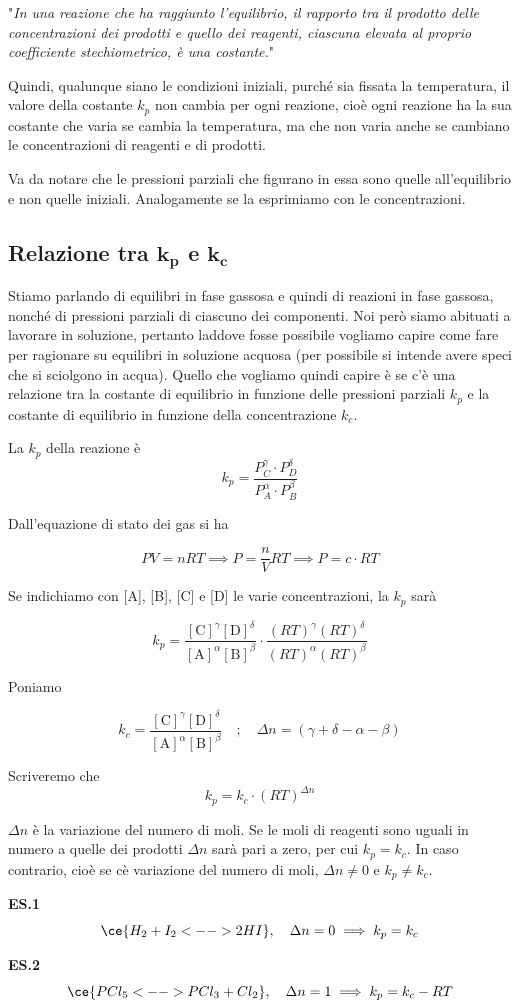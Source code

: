 \vspace{0.2cm}"\textit{In una reazione che ha raggiunto l'equilibrio, il rapporto tra il prodotto delle concentrazioni dei prodotti e quello dei reagenti, ciascuna elevata al proprio coefficiente stechiometrico, è una costante.}"

\vspace{0.2cm}Quindi, qualunque siano le condizioni iniziali, purché sia fissata la temperatura, il valore della costante $k_p$ non cambia per ogni reazione, cioè ogni reazione ha la sua costante che varia se cambia la temperatura, ma che non varia anche se cambiano le concentrazioni di reagenti e di prodotti.

Va da notare che le pressioni parziali che figurano in essa sono quelle all'equilibrio e non quelle iniziali. Analogamente se la esprimiamo con le concentrazioni.
\subsection{Relazione tra $\boldsymbol{k_p}$ e $\boldsymbol{k_c}$}
Stiamo parlando di equilibri in fase gassosa e quindi di reazioni in fase gassosa, nonché di pressioni parziali di ciascuno dei componenti. Noi però siamo abituati a lavorare in soluzione, pertanto laddove fosse possibile vogliamo capire come fare per ragionare su equilibri in soluzione acquosa (per possibile si intende avere speci che si sciolgono in acqua). Quello che vogliamo quindi capire è se c'è una relazione tra la costante di equilibrio in funzione delle pressioni parziali $k_p$ e la costante di equilibrio in funzione della concentrazione $k_c$.

La $k_p$ della reazione è
$$k_p = \frac{P_C^{\gamma} \cdot P_D^{\delta}}{P_A^{\alpha} \cdot P_B^{\beta}}$$

Dall'equazione di stato dei gas si ha

$$PV=nRT \implies P=\frac{n}{V}RT \implies P=c \cdot RT$$

Se indichiamo con [A], [B], [C] e [D] le varie concentrazioni, la $k_p$ sarà

$$k_p = \frac{[\text{C}]^{\gamma} [\text{D}]^{\delta}}{[\text{A}]^{\alpha} [\text{B}]^{\beta}} \cdot \frac{(RT)^{\gamma} (RT)^{\delta}}{(RT)^{\alpha} (RT)^{\beta}}$$

Poniamo

$$k_c = \frac{[\text{C}]^{\gamma} [\text{D}]^{\delta}}{[\text{A}]^{\alpha} [\text{B}]^{\beta}}
\quad;\quad
\Delta n= (\gamma + \delta - \alpha - \beta)$$

Scriveremo che
$$k_p = k_c \cdot (RT)^{\Delta n}$$

$\Delta n$ è la variazione del numero di moli. Se le moli di reagenti sono uguali in numero a quelle dei prodotti $\Delta n$ sarà pari a zero, per cui $k_p = k_c$. In caso contrario, cioè se cè variazione del numero di moli, $\Delta n \neq 0$ e $k_p \neq k_c$.

\vspace{0.2cm}\textbf{ES.1}
$$\ce{H_2 + I_2 <--> 2HI}, \quad \Delta n = 0 \implies k_p = k_c$$

\textbf{ES.2}
$$\ce{PCl_5  <--> PCl_3 + Cl_2}, \quad \Delta n = 1 \implies k_p = k_c - RT$$
